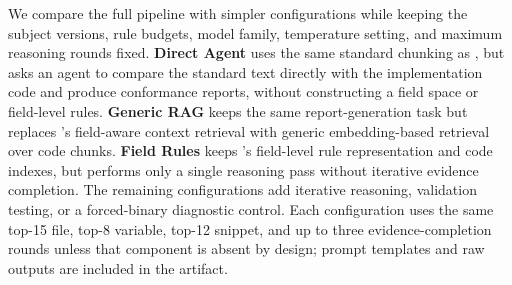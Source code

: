 \begin{table}
\centering
\caption{Protocol implementations used for evaluation.}
\label{tab:protocol-implementations}
\end{table}

We compare the full \tool{} pipeline with simpler configurations while keeping
the subject versions, rule budgets, model family, temperature setting, and
maximum reasoning rounds fixed.
\textbf{Direct Agent} uses the same standard chunking as \tool{}, but asks an
agent to compare the standard text directly with the implementation code and
produce conformance reports, without constructing a field space or field-level
rules. \textbf{Generic RAG} keeps the same report-generation task but replaces
\tool{}'s field-aware context retrieval with generic embedding-based retrieval
over code chunks. \textbf{Field Rules} keeps \tool{}'s field-level rule
representation and code indexes, but performs only a single reasoning pass
without iterative evidence completion. The remaining configurations add
iterative reasoning, validation testing, or a forced-binary diagnostic control.
Each configuration uses the
same top-15 file, top-8 variable, top-12 snippet, and up to three
evidence-completion rounds unless that component is absent by design; prompt
templates and raw outputs are included in the artifact.


